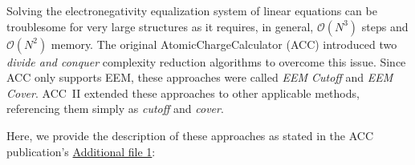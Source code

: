 \documentclass[oneside]{memoir}
\begin{document}
Solving the electronegativity equalization system of linear equations can be troublesome for very large structures as it requires, in general, ${\mathcal O}(N^3)$ steps and ${\mathcal O}(N^2)$ memory. The original AtomicChargeCalculator (ACC) introduced two \textit{divide and conquer} complexity reduction algorithms to overcome this issue. Since ACC only supports EEM, these approaches were called \textit{EEM Cutoff} and \textit{EEM Cover}. ACC~II extended these approaches to other applicable methods, referencing them simply as \textit{cutoff} and \textit{cover}.

Here, we provide the description of these approaches as stated in the ACC publication's \cite{Ionescu2015} \href{https://static-content.springer.com/esm/art%3A10.1186%2Fs13321-015-0099-x/MediaObjects/13321_2015_99_MOESM1_ESM.pdf}{Additional file 1}:
\end{document}
